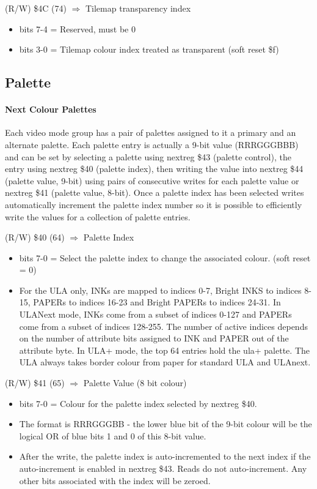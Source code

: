(R/W) \$4C (74) $\Rightarrow$ Tilemap transparency index
\begin{itemize}
\item bits 7-4 = Reserved, must be 0
\item bits 3-0 = Tilemap colour index treated as transparent (soft
  reset \$f)
\end{itemize}

\subsection{Palette}
\paragraph{Next Colour Palettes}
Each video mode group has a pair of palettes assigned to it a primary
and an alternate palette. Each palette entry is actually a 9-bit value
(RRRGGGBBB) and can be set by selecting a palette using nextreg \$43
(palette control), the entry using nextreg \$40 (palette index), then
writing the value into nextreg \$44 (palette value, 9-bit) using pairs
of consecutive writes for each palette value or nextreg \$41 (palette
value, 8-bit). Once a palette index has been selected writes
automatically increment the palette index number so it is possible to
efficiently write the values for a collection of palette entries.

(R/W) \$40 (64) $\Rightarrow$ Palette Index
\begin{itemize}
\item bits 7-0 = Select the palette index to change the associated
  colour. (soft reset = 0)
\item[] For the ULA only, INKs are mapped to indices 0-7, Bright INKS
  to indices 8-15, PAPERs to indices 16-23 and Bright PAPERs to
  indices 24-31.  In ULANext mode, INKs come from a subset of indices
  0-127 and PAPERs come from a subset of indices 128-255.  The number
  of active indices depends on the number of attribute bits assigned
  to INK and PAPER out of the attribute byte.  In ULA+ mode, the top
  64 entries hold the ula+ palette.  The ULA always takes border
  colour from paper for standard ULA and ULAnext.
\end{itemize}

(R/W) \$41 (65) $\Rightarrow$ Palette Value (8 bit colour)
\begin{itemize}
\item bits 7-0 = Colour for the palette index selected by nextreg
  \$40.
\item[] The format is RRRGGGBB - the lower blue bit of the 9-bit
  colour will be the logical OR of blue bits 1 and 0 of this 8-bit
  value.
\item[] After the write, the palette index is auto-incremented to the
  next index if the auto-increment is enabled in nextreg \$43.  Reads
  do not auto-increment.  Any other bits associated with the index
  will be zeroed.
\end{itemize}


